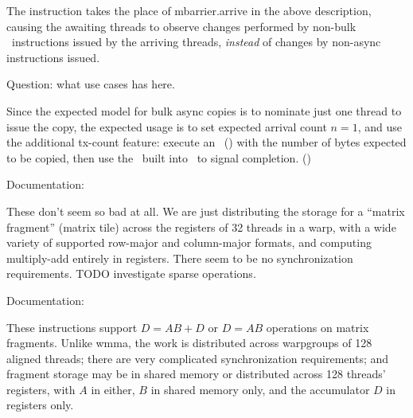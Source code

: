 \filbreak
{} The  instruction takes the place of mbarrier.arrive in the above description, causing the awaiting threads to observe changes performed by non-bulk \cpAsync\ instructions issued by the arriving threads, \textit{instead} of changes by non-async instructions issued.

Question: what use cases  has here.

\filbreak
{} Since the expected model for bulk async copies is to nominate just one thread to issue the copy, the expected usage is to set expected arrival count $n = 1$, and use the additional tx-count feature: execute an \expectTxOperation\ () with the number of bytes expected to be copied, then use the \completeTxOperation\ built into \cpAsyncBulk\ to signal completion. ()

\filbreak
{}

Documentation: 

These don't seem so bad at all. We are just distributing the storage for a ``matrix fragment'' (matrix tile) across the registers of 32 threads in a warp, with a wide variety of supported row-major and column-major formats, and computing multiply-add entirely in registers. There seem to be no synchronization requirements. TODO investigate sparse operations.

\filbreak
{}

Documentation: 

These  instructions support $D = AB + D$ or $D = AB$ operations on matrix fragments. Unlike wmma, the work is distributed across warpgroups of 128 aligned threads; there are very complicated synchronization requirements; and fragment storage may be in shared memory or distributed across 128 threads' registers, with $A$ in either, $B$ in shared memory only, and the accumulator $D$ in registers only.

